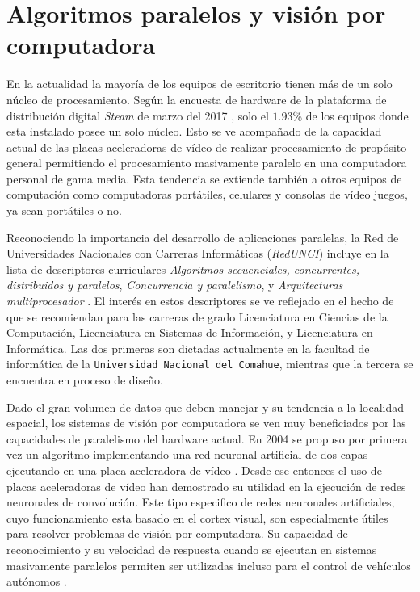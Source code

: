 
\section{Algoritmos paralelos y visión por computadora}

\label{algoritmosParalelosYVision}

En la actualidad la mayoría de los equipos de escritorio tienen más de un solo
núcleo de procesamiento. Según la encuesta de hardware de la plataforma de
distribución digital \emph{Steam} de marzo del 2017 \cite{steamSurvey}, solo
el $1.93$\% de los equipos donde esta instalado posee un solo núcleo. Esto se
ve acompañado de la capacidad actual de las placas aceleradoras de vídeo de
realizar procesamiento de propósito general permitiendo el procesamiento
masivamente paralelo en una computadora personal de gama media. Esta tendencia
se extiende también a otros equipos de computación como computadoras
portátiles, celulares y consolas de vídeo juegos, ya sean portátiles o no.

Reconociendo la importancia del desarrollo de aplicaciones paralelas, la Red
de Universidades Nacionales con Carreras Informáticas (\emph{RedUNCI}) incluye
en la lista de descriptores curriculares \emph{Algoritmos secuenciales,
concurrentes, distribuidos y paralelos}, \emph{Concurrencia y paralelismo}, y
\emph{Arquitecturas multiprocesador} \cite{RedUNCI2015}. El interés en estos
descriptores se ve reflejado en el hecho de que se recomiendan para las
carreras de grado Licenciatura en Ciencias de la Computación, Licenciatura en
Sistemas de Información, y Licenciatura en Informática. Las dos primeras son
dictadas actualmente en la facultad de informática de la \texttt{Universidad
Nacional del Comahue}, mientras que la tercera se encuentra en proceso de
diseño.

Dado el gran volumen de datos que deben manejar y su tendencia a la localidad
espacial, los sistemas de visión por computadora se ven muy beneficiados por
las capacidades de paralelismo del hardware actual. En 2004 se propuso por
primera vez un algoritmo implementando una red neuronal artificial de dos
capas ejecutando en una placa aceleradora de vídeo \cite{GPUforMLA}. Desde ese
entonces el uso de placas aceleradoras de vídeo han demostrado su utilidad en la
ejecución de redes neuronales de convolución. Este tipo especifico de redes
neuronales artificiales, cuyo funcionamiento esta basado en el cortex visual,
son especialmente útiles para resolver problemas de visión por computadora. Su
capacidad de reconocimiento y su velocidad de respuesta cuando se ejecutan en
sistemas masivamente paralelos permiten ser utilizadas incluso para el control
de vehículos autónomos \cite{e2eLearning4SDC}.


